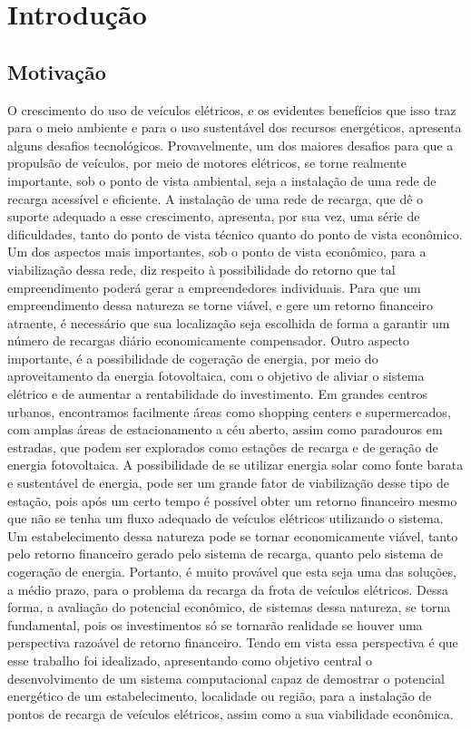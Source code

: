 \chapter{Introdução}

\section{Motivação}\label{Motivação}

O crescimento do uso de veículos elétricos, e os evidentes benefícios que isso traz para o meio ambiente e para o uso sustentável dos recursos energéticos, apresenta alguns desafios tecnológicos. Provavelmente, um dos maiores desafios para que a propulsão de veículos, por meio de motores elétricos, se torne realmente importante, sob o ponto de vista ambiental, seja a instalação de uma rede de recarga acessível e eficiente.
A instalação de uma rede de recarga, que dê o suporte adequado a esse crescimento, apresenta, por sua vez, uma série de dificuldades, tanto do ponto de vista técnico quanto do ponto de vista econômico. Um dos aspectos mais importantes, sob o ponto de vista econômico, para a viabilização dessa rede, diz respeito à possibilidade do retorno que tal empreendimento poderá gerar a empreendedores individuais.  Para que um empreendimento dessa natureza se torne viável, e gere um retorno financeiro atraente, é necessário que sua localização seja escolhida de forma a garantir um número de recargas diário economicamente compensador. Outro aspecto importante, é a possibilidade de cogeração de energia, por meio do aproveitamento da energia fotovoltaica, com o objetivo de aliviar o sistema elétrico e de aumentar a rentabilidade do investimento. Em grandes centros urbanos, encontramos facilmente áreas como shopping centers e supermercados, com amplas áreas de estacionamento a céu aberto, assim como paradouros em estradas, que podem ser explorados como estações de recarga e de geração de energia fotovoltaica. A possibilidade de se utilizar energia solar como fonte barata e sustentável de energia, pode ser um grande fator de viabilização desse tipo de estação, pois após um certo tempo é possível obter um retorno financeiro mesmo que não se tenha um fluxo adequado de veículos elétricos utilizando o sistema. Um estabelecimento dessa natureza pode se tornar economicamente viável, tanto pelo retorno financeiro gerado pelo sistema de recarga, quanto pelo sistema de cogeração de energia. Portanto, é muito provável que esta seja uma das soluções, a médio prazo, para o problema da recarga da frota de veículos elétricos. Dessa forma, a avaliação do potencial econômico, de sistemas dessa natureza, se torna fundamental, pois os investimentos só se tornarão realidade se houver uma perspectiva razoável de retorno financeiro. Tendo em vista essa perspectiva é que esse trabalho foi idealizado, apresentando como objetivo central o desenvolvimento de um sistema computacional capaz de demostrar o potencial energético de um estabelecimento, localidade ou região, para a instalação de pontos de recarga de veículos elétricos, assim como a sua viabilidade econômica.

